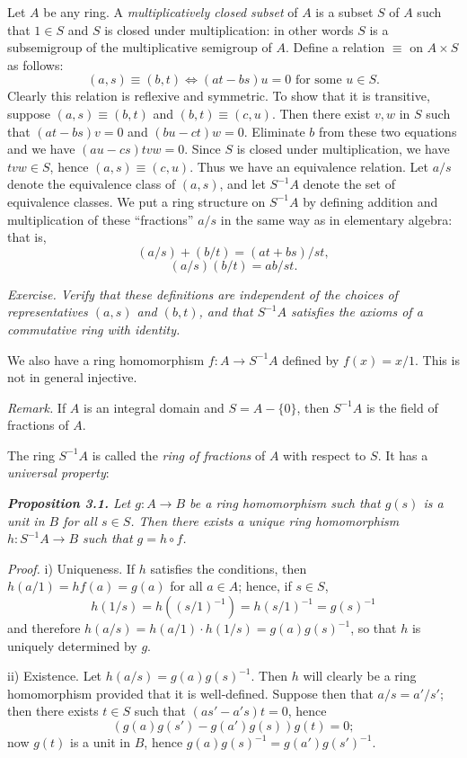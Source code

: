 Let $A$ be any ring.  A \emph{multiplicatively closed subset} of $A$ is a subset $S$ of $A$
such that $1\in S$ and $S$ is closed under multiplication: in other words $S$ is a subsemigroup of the multiplicative semigroup of $A$.  Define a relation $\equiv$ on $A\times S$
as follows:
\[
(a,s)\equiv(b,t)\Longleftrightarrow(at-bs)u=0\text{ for some }u\in S.
\]
Clearly this relation is reflexive and symmetric.  To show that it is transitive,
suppose $(a,s)\equiv(b,t)$ and $(b,t)\equiv(c,u)$.  Then there exist $v,w$ in $S$ such that
$(at-bs)v=0$ and $(bu-ct)w=0$.  Eliminate $b$ from these two equations
and we have $(au-cs)tvw=0$.  Since $S$ is closed under multiplication, we have
$tvw\in S$, hence $(a,s)\equiv(c,u)$.  Thus we have an equivalence relation.  Let $a/s$
denote the equivalence class of $(a,s)$, and let $S^{-1}A$ denote the set of equivalence
classes.  We put a ring structure on $S^{-1}A$ by defining addition and multiplication
of these ``fractions'' $a/s$ in the same way as in elementary algebra: that is,
\[
(a/s)+(b/t)=(at+bs)/st,
\]
\[
(a/s)(b/t)=ab/st.
\]

\emph{Exercise.  Verify that these definitions are independent of the choices of representatives $(a,s)$ and $(b,t)$, and that $S^{-1}A$ satisfies the axioms of a commutative ring with identity.}

We also have a ring homomorphism $f:A\longrightarrow S^{-1}A$ defined by $f(x)=x/1$.
This is not in general injective.

\emph{Remark.}  If $A$ is an integral domain and $S=A-\{0\}$, then $S^{-1}A$ is the field
of fractions of $A$.

The ring $S^{-1}A$ is called the \emph{ring of fractions} of $A$ with respect to $S$.  It has a
\emph{universal property}:

\medskip
\noindent\textit{\textbf{Proposition 3.1.} Let $g:A\longrightarrow B$ be a ring homomorphism such that $g(s)$
is a unit in $B$ for all $s\in S$.  Then there exists a unique ring homomorphism
$h:S^{-1}A\longrightarrow B$ such that $g=h\circ f$.}

\noindent\emph{Proof.}  i) Uniqueness.  If $h$ satisfies the conditions, then $h(a/1)=hf(a)=g(a)$
for all $a\in A$; hence, if $s\in S$,
\[
h(1/s)=h((s/1)^{-1})=h(s/1)^{-1}=g(s)^{-1}
\]
and therefore $h(a/s)=h(a/1)\cdot h(1/s)=g(a)g(s)^{-1}$, so that $h$ is uniquely
determined by $g$.

ii) Existence.  Let $h(a/s)=g(a)g(s)^{-1}$.  Then $h$ will clearly be a ring homomorphism provided that it is well-defined.  Suppose then that $a/s=a'/s'$; then
there exists $t\in S$ such that $(as'-a's)t=0$, hence
\[
(g(a)g(s')-g(a')g(s))g(t)=0;
\]
now $g(t)$ is a unit in $B$, hence $g(a)g(s)^{-1}=g(a')g(s')^{-1}$.\proofbox

